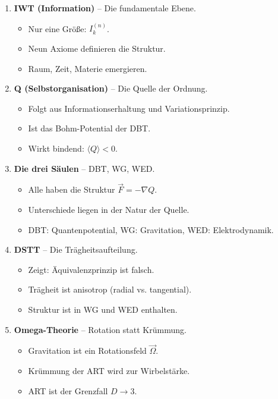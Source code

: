 \begin{enumerate}
\item \textbf{IWT (Information)} – Die fundamentale Ebene.
      \begin{itemize}
      \item Nur eine Größe: \( I_k^{(n)} \).
      \item Neun Axiome definieren die Struktur.
      \item Raum, Zeit, Materie emergieren.
      \end{itemize}
      
\item \textbf{Q (Selbstorganisation)} – Die Quelle der Ordnung.
      \begin{itemize}
      \item Folgt aus Informationserhaltung und Variationsprinzip.
      \item Ist das Bohm-Potential der DBT.
      \item Wirkt bindend: \( \langle Q \rangle < 0 \).
      \end{itemize}
      
\item \textbf{Die drei Säulen} – DBT, WG, WED.
      \begin{itemize}
      \item Alle haben die Struktur \( \vec{F} = -\nabla Q \).
      \item Unterschiede liegen in der Natur der Quelle.
      \item DBT: Quantenpotential, WG: Gravitation, WED: Elektrodynamik.
      \end{itemize}
      
\item \textbf{DSTT} – Die Trägheitsaufteilung.
      \begin{itemize}
      \item Zeigt: Äquivalenzprinzip ist falsch.
      \item Trägheit ist anisotrop (radial vs. tangential).
      \item Struktur ist in WG und WED enthalten.
      \end{itemize}
      
\item \textbf{Omega-Theorie} – Rotation statt Krümmung.
      \begin{itemize}
      \item Gravitation ist ein Rotationsfeld \( \vec{\Omega} \).
      \item Krümmung der ART wird zur Wirbelstärke.
      \item ART ist der Grenzfall \( D \to 3 \).
      \end{itemize}
      

\end{enumerate}
